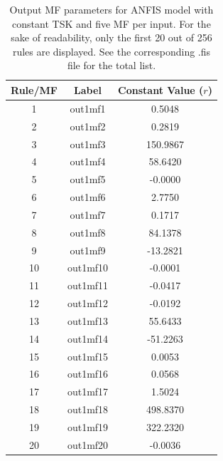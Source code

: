 \documentclass[12pt]{article}
\begin{document}
\begin{table}[H]
\centering
\caption{Constant Consequent Parameters for mymodel3constant (First 20 of 625 Rules)}
\begin{tabular}{|c|c|c|}
\hline
\textbf{Rule/MF} & \textbf{Label} & \textbf{Constant Value ($r$)} \\ \hline
1 & out1mf1 & 0.5048 \\ \hline
2 & out1mf2 & 0.2819 \\ \hline
3 & out1mf3 & 150.9867 \\ \hline
4 & out1mf4 & 58.6420 \\ \hline
5 & out1mf5 & -0.0000 \\ \hline
6 & out1mf6 & 2.7750 \\ \hline
7 & out1mf7 & 0.1717 \\ \hline
8 & out1mf8 & 84.1378 \\ \hline
9 & out1mf9 & -13.2821 \\ \hline
10 & out1mf10 & -0.0001 \\ \hline
11 & out1mf11 & -0.0417 \\ \hline
12 & out1mf12 & -0.0192 \\ \hline
13 & out1mf13 & 55.6433 \\ \hline
14 & out1mf14 & -51.2263 \\ \hline
15 & out1mf15 & 0.0053 \\ \hline
16 & out1mf16 & 0.0568 \\ \hline
17 & out1mf17 & 1.5024 \\ \hline
18 & out1mf18 & 498.8370 \\ \hline
19 & out1mf19 & 322.2320 \\ \hline
20 & out1mf20 & -0.0036 \\ \hline
\end{tabular}
\caption{Output MF parameters for ANFIS model with constant TSK and five MF per input. 
For the sake of readability, only the first 20 out of 256 rules are displayed. 
See the corresponding .fis file for the total list. }
\end{table}
\end{document}
